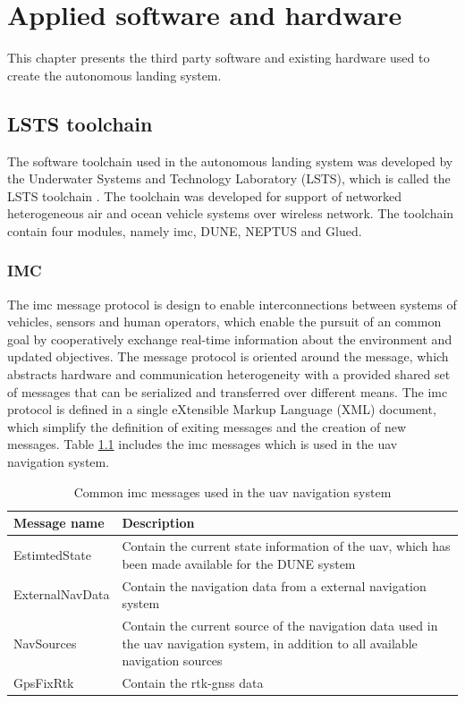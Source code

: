 \chapter{Applied software and hardware}
This chapter presents the third party software and existing hardware used to create the autonomous landing system.
\section{LSTS toolchain}
The software toolchain used in the autonomous landing system was developed by the Underwater Systems and Technology Laboratory (LSTS), which is called the LSTS toolchain \citep{pinto2013lsts}. The toolchain was developed for support of networked heterogeneous air and ocean vehicle systems over wireless network. The toolchain contain four modules, namely \gls{imc}, DUNE, NEPTUS and Glued.
\subsection{IMC}
The \acrfull{imc} message protocol \citep{martins2009imc} is design to enable interconnections between systems of vehicles, sensors and human operators, which enable the pursuit of an common goal by cooperatively exchange real-time information about the environment and updated objectives. The message protocol is oriented around the message, which abstracts hardware and communication heterogeneity with a provided shared set of messages that can be serialized and transferred over different means. The \gls{imc} protocol is defined in a single eXtensible Markup Language (XML) document, which simplify the definition of exiting messages and the creation of new messages. Table \ref{Tb:IMCmessages} includes the \gls{imc} messages which is used in the \gls{uav} navigation system.
\begin{table}[H]
\centering
\begin{tabular}{| p{2.5cm} | p{9cm} |}
\hline
\textbf{Message name} & \textbf{Description} \\ \hline
EstimtedState	& Contain the current state information of the \gls{uav}, which has been made available for the DUNE system	\\ \hline
ExternalNavData & Contain the navigation data from a external navigation system	\\ \hline
NavSources		& Contain the current source of the navigation data used in the \gls{uav} navigation system, in addition to all available navigation sources\\ \hline
GpsFixRtk		& Contain the \gls{rtk-gnss} data \\ \hline
\end{tabular}
\caption{Common \gls{imc} messages used in the \gls{uav} navigation system}
\label{Tb:IMCmessages}
\end{table}
